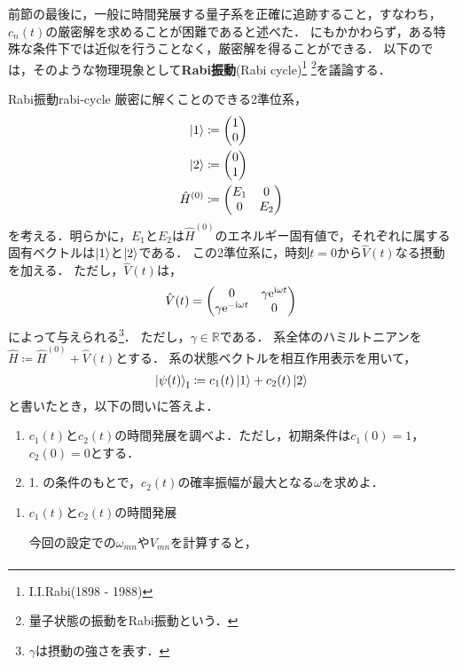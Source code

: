 \documentclass{report}
\begin{document}
  前節の最後に，一般に時間発展する量子系を正確に追跡すること，すなわち，$c_n(t)$の厳密解を求めることが困難であると述べた．
  にもかかわらず，ある特殊な条件下では近似を行うことなく，厳密解を得ることができる．
  以下のでは，そのような物理現象として\textbf{Rabi振動}(Rabi cycle)\footnote{I.I.Rabi(1898 - 1988)}
  \footnote{量子状態の振動をRabi振動という．}を議論する．
  \begin{myex}{Rabi振動}{rabi-cycle}
    厳密に解くことのできる2準位系，
    \begin{align}
      \ket{1} &\coloneqq \mqty(1\\ 0) \\
      \ket{2} &\coloneqq \mqty(0\\ 1) \\
      \hat{H}^{(0)} &\coloneqq \mqty(E_1 & 0\\ 0 & E_2)
    \end{align}
    を考える．明らかに，$E_1$と$E_2$は$\hat{H}^{(0)}$のエネルギー固有値で，それぞれに属する固有ベクトルは$\ket{1}$と$\ket{2}$である．
    この2準位系に，時刻$t = 0$から$\hat{V}(t)$なる摂動を加える．
    ただし，$\hat{V}(t)$は，
    \begin{align}
      \hat{V}(t) = \mqty(
        0 & \gamma\e^{\i\omega t} \\
        \gamma\e^{-\i\omega t} & 0
      )
    \end{align}
    によって与えられる\footnote{$\gamma$は摂動の強さを表す．}．
    ただし，$\gamma \in \mathbb{R}$である．
    系全体のハミルトニアンを$\hat{H} \coloneqq \hat{H}^{(0)} + \hat{V}(t)$とする．
    系の状態ベクトルを相互作用表示を用いて，
    \begin{align}
      \ket{\psi(t)}_{\mathrm{I}} \coloneqq c_1(t)\ket{1} + c_2(t)\ket{2}
    \end{align}
    と書いたとき，以下の問いに答えよ．
    \begin{enumerate}
      \item $c_1(t)$と$c_2(t)$の時間発展を調べよ．ただし，初期条件は$c_1(0) = 1$，$c_2(0) = 0$とする．
      \item 1. の条件のもとで，$c_2(t)$の確率振幅が最大となる$\omega$を求めよ．
    \end{enumerate}
    \tcblower
    \begin{enumerate}
      \item $c_1(t)$と$c_2(t)$の時間発展\par
        今回の設定での$\omega_{mn}$や$V_{mn}$を計算すると，
        \begin{align}

\end{align}
\end{enumerate}
\end{myex}
\end{document}
